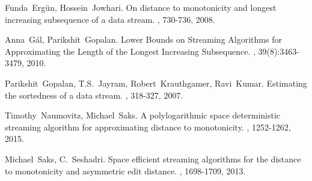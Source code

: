 \documentclass[11pt]{article}
\begin{document}
\begin{thebibliography}{42}

Funda~Erg\"un, Hossein~Jowhari.
\newblock On distance to monotonicity and longest increasing subsequence of a data stream.
, 730-736, 2008.

Anna~G\'al, Parikshit~Gopalan.
\newblock  Lower Bounds on Streaming Algorithms for Approximating the Length of the Longest Increasing Subsequence.
, 39(8):3463-3479, 2010.

Parikshit~Gopalan, T.S.~Jayram, Robert~Krauthgamer, Ravi~Kumar.
\newblock Estimating the sortedness of a data stream.
, 318-327, 2007.

Timothy~Naumovitz, Michael~Saks.
\newblock A polylogarithmic space deterministic streaming algorithm for approximating distance to monotonicity.
, 1252-1262, 2015.

Michael~Saks, C.~Seshadri.
\newblock Space efficient streaming algorithms for the distance to monotonicity and asymmetric edit distance.
, 1698-1709, 2013.

\end{thebibliography}
\end{document}
